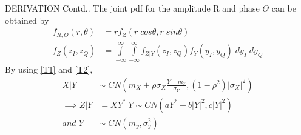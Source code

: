 \documentclass{beamer}
\providecommand{\brak}[1]{\ensuremath{\left(#1\right)}}
\begin{document}
\begin{frame}{DERIVATION Contd..}
    The joint pdf for the amplitude R and phase $\Theta$ can be obtained by
    \begin{align}
        f_{R,\Theta}\brak{r,\theta}&=rf_{Z}\brak{r\;cos\theta,r \; sin\theta}\\
        f_{Z}\brak{z_I,z_Q}&=\int\limits_{-\infty}^{\infty}\int\limits_{-\infty}^{\infty}f_{Z|Y}\brak{z_I,z_Q}f_{Y}\brak{y_I,y_Q} \;dy_I\;dy_Q\label{e0}
    \end{align}
    By using \eqref{T1} and \eqref{T2},
    \begin{align}
        X|Y&\sim\;CN\brak{m_X+\rho\sigma_X\frac{Y-m_Y}{\sigma_Y},\brak{1-\rho^2}|\sigma_X|^2}\\
        \implies Z|Y&=XY^*|Y\sim CN\brak{aY^*+b|Y|^2,c|Y|^2}\label{e1}\\
        and\; Y&\sim\;CN\brak{m_y,\sigma_y^2}\label{e2}
    \end{align}
    
\end{frame}
\end{document}
